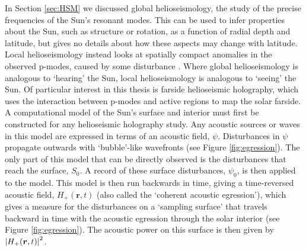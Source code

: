 \documentclass[11pt,a4paper,onecolumn]{report}
\DeclarePairedDelimiter{\abs}{\lvert}{\rvert}
\begin{document}


In Section \ref{sec:HSM} we discussed global helioseismology, the
study of the precise frequencies of the Sun's resonant modes. This can be used
to infer properties about the Sun, such as structure or rotation, as a function
of radial depth and latitude, but gives no details about how these aspects may
change with latitude. Local helioseismology instead looks at
spatially compact anomalies in the observed p-modes, caused by some disturbance
\citep{braun_absorption_1988}. Where global helioseismology is analogous to
`hearing' the Sun, local helioseismology is analogous to `seeing' the Sun. Of
particular interest in this thesis is farside helioseismic holography, which
uses the interaction between p-modes and active regions to map the solar farside. \\




A computational model of the Sun's surface and interior must first be constructed for
any helioseismic holography study. Any acoustic sources or waves in this model
are expressed in terms of an acoustic field, \(\psi\). Disturbances in \(\psi\)
propagate outwards with `bubble'-like wavefronts (see Figure
\ref{fig:egression}). The only part of this model that can be directly observed
is the disturbances that reach the surface, \(S_0\). A record of these surface
disturbances, \(\psi_0\), is then applied to the model. This model is then run
backwards in time, giving a time-reversed acoustic field, \(H_+(\bm{r}, t)\)
(also called the `coherent acoustic egression'), which gives a measure for the
disturbances on a `sampling surface' that travels backward in time with the
acoustic egression through the solar interior (see Figure \ref{fig:egression}).
The acoustic power on this surface is then given by \(\abs*{H_+(\bm{r},
t)}^2\).\\
\end{document}

